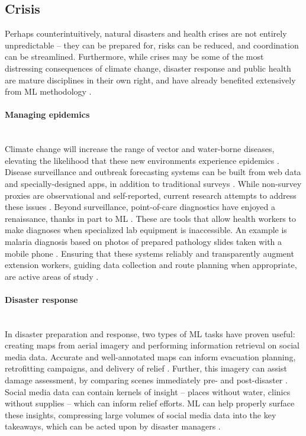 \documentclass[11pt]{report}
\newcommand{\Gap}{\texorpdfstring{\hfill}{}}
\newcommand{\Rec}{\texorpdfstring{{\small\emph{\color{blue}{\fbox{High Leverage}}}}}{}}
\begin{document}
\subsection{Crisis}
\label{subsub:crisis}

Perhaps counterintuitively, natural disasters and health crises are not entirely
unpredictable -- they can be prepared for, risks can be reduced, and
coordination can be streamlined. Furthermore, while crises may be some of the
most distressing consequences of climate change, disaster response and public
health are mature disciplines in their own right, and have already benefited
extensively from ML methodology \cite{meier2013human, castillo2016big,
yasnoff2000public}.

\paragraph*{Managing epidemics}\Gap\mbox{}\\ 
Climate change will increase the range of vector and water-borne
diseases, elevating the likelihood that these new environments experience epidemics \cite{haines2006climate}.
Disease surveillance and outbreak forecasting systems can be
built from web data and specially-designed apps, in addition to traditional
surveys \cite{pervaiz2012flubreaks, lampos2010flu, johansson2016evaluating}.
While non-survey proxies are observational and self-reported, current research
attempts to address these issues \cite{lazer2014parable, nuti2014use}. Beyond
surveillance, point-of-care diagnostics have enjoyed a renaissance, thanks in
part to ML \cite{quinn2014computational, onu2017ubenwa}. These are tools that
allow health workers to make diagnoses when specialized lab equipment is
inaccessible. An example is malaria diagnosis based on photos of prepared
pathology slides taken with a mobile phone \cite{quinn2014automated}. Ensuring
that these systems reliably and transparently augment extension workers, guiding
data collection and route planning when appropriate, are active areas of study
\cite{robertson2010agile, brunskill2010routing}.

\paragraph*{Disaster response}\Gap\textbf{\Rec}\mbox{}\\ In disaster preparation and response, two types of ML
tasks have proven useful: creating maps from aerial imagery and performing
information retrieval on social media data. Accurate and well-annotated maps can
inform evacuation planning, retrofitting campaigns, and delivery of relief
\cite{doshi2018satellite, bastani2018machine}. Further, this imagery can assist 
damage assessment, by comparing scenes immediately pre- and  post-disaster 
\cite{voigt2007satellite, gupta2019creating}. Social media data can contain kernels of insight -- 
places without water, clinics without supplies -- which can inform relief efforts. 
ML can help properly surface these insights, compressing large volumes of social media 
data into the key takeaways, which can be acted upon by disaster managers 
\cite{olteanu2014crisislex, imran2015processing, castillo2016big}.
\end{document}
